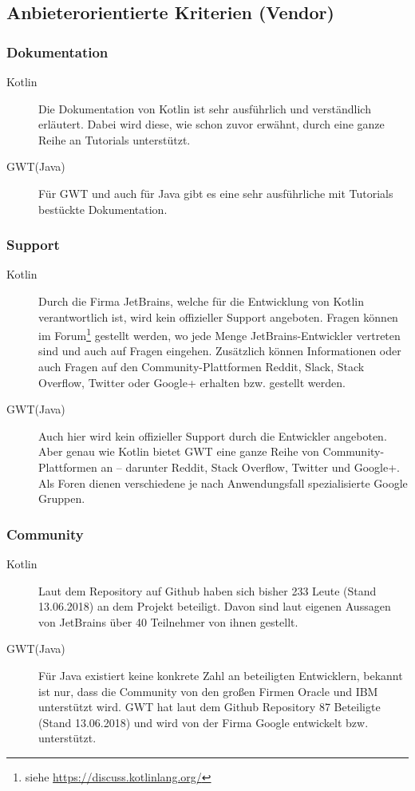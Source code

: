 \subsection{Anbieterorientierte Kriterien (Vendor)}
\subsubsection{Dokumentation}
\begin{description}
	\item[Kotlin] Die Dokumentation von Kotlin ist sehr ausführlich und verständlich erläutert. Dabei wird diese, wie schon zuvor erwähnt, durch eine ganze Reihe an Tutorials unterstützt. \cite{kotlinReference}
	\item[GWT(Java)] Für \gls{GWT} und auch für Java gibt es eine sehr ausführliche mit Tutorials bestückte Dokumentation. \cite{gwtDevGuide, javaDoc}
\end{description}

\subsubsection{Support}
\begin{description}
	\item[Kotlin] Durch die Firma JetBrains, welche für die Entwicklung von Kotlin verantwortlich ist, wird kein offizieller Support angeboten. Fragen können im Forum\footnote{siehe \url{https://discuss.kotlinlang.org/}} gestellt werden, wo jede Menge JetBrains-Entwickler vertreten sind und auch auf Fragen eingehen. Zusätzlich können Informationen oder auch Fragen auf den Community-Plattformen Reddit, Slack, Stack Overflow, Twitter oder Google+ erhalten bzw. gestellt werden. \cite{kotlinCommunity}
	\item[GWT(Java)] Auch hier wird kein offizieller Support durch die Entwickler angeboten. Aber genau wie Kotlin bietet \gls{GWT} eine ganze Reihe von Community-Plattformen an -- darunter Reddit, Stack Overflow, Twitter und Google+. Als Foren dienen verschiedene je nach Anwendungsfall spezialisierte Google Gruppen. \cite{gwtCommunity}
\end{description}

\subsubsection{Community}
\begin{description}
	\item[Kotlin] Laut dem Repository auf Github haben sich bisher 233 Leute (Stand 13.06.2018) an dem Projekt beteiligt. Davon sind laut eigenen Aussagen von JetBrains über 40 Teilnehmer von ihnen gestellt. \cite{kotlinWhoDevelops}
	\item[GWT(Java)] Für Java existiert keine konkrete Zahl an beteiligten Entwicklern, bekannt ist nur, dass die Community von den großen Firmen Oracle und IBM unterstützt wird. \gls{GWT} hat laut dem Github Repository 87 Beteiligte (Stand 13.06.2018) und wird von der Firma Google entwickelt bzw. unterstützt. \cite{oracleIBMCollaborate, gwtTerms}
\end{description}


